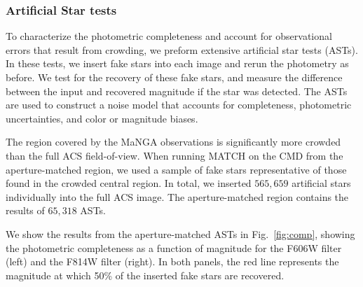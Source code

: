 \documentclass[preprint2]{aastex62}
\begin{document}
\subsubsection{Artificial Star tests}

To characterize the photometric completeness and account for observational errors that result from crowding, we preform extensive artificial star tests (ASTs). In these tests, we insert fake stars into each image and rerun the photometry as before. We test for the recovery of these fake stars, and measure the difference between the input and recovered magnitude if the star was detected. The ASTs are used to construct a noise model that accounts for completeness, photometric uncertainties, and color or magnitude biases.

The region covered by the MaNGA observations is significantly more crowded than the full ACS field-of-view. When running MATCH on the CMD from the aperture-matched region, we used a sample of fake stars representative of those found in the crowded central region. In total, we inserted $565,659$ artificial stars individually into the full ACS image. The aperture-matched region contains the results of $65,318$ ASTs.

We show the results from the aperture-matched ASTs in Fig.~\ref{fig:comp}, showing the photometric completeness as a function of magnitude for the F606W filter (left) and the F814W filter (right). In both panels, the red line represents the magnitude at which 50\% of the inserted fake stars are recovered.
\end{document}
